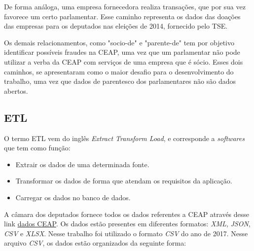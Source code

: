 De forma análoga, uma empresa fornecedora realiza transações, que por sua vez favorece um certo parlamentar. Esse caminho representa os dados das doações das empresas para os deputados nas eleições de 2014, fornecido pelo TSE. 

Os demais relacionamentos, como "socio-de" e "parente-de" tem por objetivo identificar possíveis fraudes na CEAP, uma vez que um parlamentar não pode utilizar a verba da CEAP com serviços de uma empresa que é sócio. Esses dois caminhos, se apresentaram como o maior desafio para o desenvolvimento do trabalho, uma vez que dados de parentesco dos parlamentares não são dados abertos.

\subsection{ETL} \label{etl-subsection}

	O termo ETL vem do inglês \textit{Extract Transform Load}, e corresponde a \textit{softwares} que tem como função:
\begin{itemize}
		\item Extrair os dados de uma determinada fonte.
		\item Transformar os dados de forma que atendam os requisitos da aplicação.
		\item Carregar os dados no banco de dados.
\end{itemize}
	
	A câmara dos deputados fornece todos os dados referentes a CEAP através desse link \href{http://www2.camara.leg.br/transparencia/cota-para-exercicio-da-atividade-parlamentar/dados-abertos-cota-parlamentar}{dados CEAP}. Os dados estão presentes em diferentes formatos: \textit{XML}, \textit{JSON}, \textit{CSV} e \textit{XLSX}. Nesse trabalho foi utilizado o formato \textit{CSV} do ano de 2017. Nesse arquivo \textit{CSV}, os dados estão organizados da seguinte forma:


